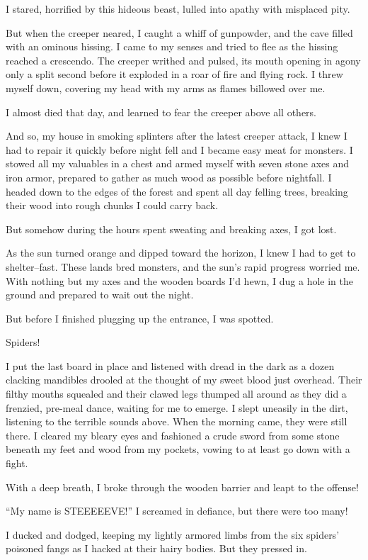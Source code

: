 \documentclass[]{book}
\begin{document}
I stared, horrified by this hideous beast, lulled into apathy with
misplaced pity.

But when the creeper neared, I caught a whiff of gunpowder, and the cave
filled with an ominous hissing. I came to my senses and tried to flee as
the hissing reached a crescendo. The creeper writhed and pulsed, its
mouth opening in agony only a split second before it exploded in a roar
of fire and flying rock. I threw myself down, covering my head with my
arms as flames billowed over me.

I almost died that day, and learned to fear the creeper above all
others.

And so, my house in smoking splinters after the latest creeper attack, I
knew I had to repair it quickly before night fell and I became easy meat
for monsters. I stowed all my valuables in a chest and armed myself with
seven stone axes and iron armor, prepared to gather as much wood as
possible before nightfall. I headed down to the edges of the forest and
spent all day felling trees, breaking their wood into rough chunks I
could carry back.

But somehow during the hours spent sweating and breaking axes, I got
lost.

As the sun turned orange and dipped toward the horizon, I knew I had to
get to shelter--fast. These lands bred monsters, and the sun's rapid
progress worried me. With nothing but my axes and the wooden boards I'd
hewn, I dug a hole in the ground and prepared to wait out the night.

But before I finished plugging up the entrance, I was spotted.

Spiders!

I put the last board in place and listened with dread in the dark as a
dozen clacking mandibles drooled at the thought of my sweet blood just
overhead. Their filthy mouths squealed and their clawed legs thumped all
around as they did a frenzied, pre-meal dance, waiting for me to emerge.
I slept uneasily in the dirt, listening to the terrible sounds above.
When the morning came, they were still there. I cleared my bleary eyes
and fashioned a crude sword from some stone beneath my feet and wood
from my pockets, vowing to at least go down with a fight.

With a deep breath, I broke through the wooden barrier and leapt to the
offense!

``My name is STEEEEEVE!'' I screamed in defiance, but there were too
many!

I ducked and dodged, keeping my lightly armored limbs from the six
spiders' poisoned fangs as I hacked at their hairy bodies. But they
pressed in.
\end{document}
